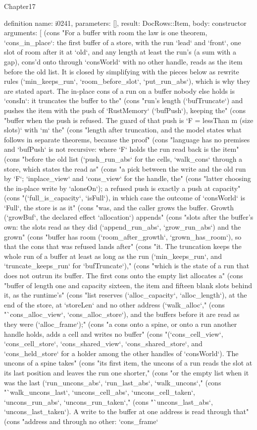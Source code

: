 \begin{lexlean}{Chapter17}
\begin{semanticmodule}
definition{
  name: i0241,
  parameters: [],
  result: DocRows::Item,
  body: constructor{
    arguments: [
      (cons "For a buffer with room the law is one theorem, `cons_in_place`: the first buffer of a store, with the run `lead` and `front`, one slot of room after it at `old`, and any length at least the run's (a sum with a gap), cons'd onto through `consWorld` with no other handle, reads as the item before the old list. It is closed by simplifying with the pieces below as rewrite rules (`min_keeps_run`, `room_before_slot`, `put_run_abs`), which is why they are stated apart. The in-place cons of a run on a buffer nobody else holds is `consIn`: it truncates the buffer to the" (cons "run's length (`bufTruncate`) and pushes the item with the push of `RustMemory` (`bufPush`), keeping the" (cons "buffer when the push is refused. The guard of that push is `F = lessThan m (size slots)` with `m` the" (cons "length after truncation, and the model states what follows in separate theorems, because the proof" (cons "language has no premises and `bufPush` is not recursive: where `F` holds the run read back is the item" (cons "before the old list (`push_run_abs` for the cells, `walk_cons` through a store, which states the read as" (cons "a pick between the write and the old run by `F`; `inplace_view` and `cons_view` for the handle, the" (cons "latter choosing the in-place write by `aloneOn`); a refused push is exactly a push at capacity" (cons "(`full_is_capacity`, `isFull`), in which case the outcome of `consWorld` is `Full`, the store is as it" (cons "was, and the caller grows the buffer. Growth (`growBuf`, the declared effect `allocation`) appends" (cons "slots after the buffer's own: the slots read as they did (`append_run_abs`, `grow_run_abs`) and the grown" (cons "buffer has room (`room_after_growth`, `grown_has_room`), so that the cons that was refused lands after" (cons "it. The truncation keeps the whole run of a buffer at least as long as the run (`min_keeps_run`, and `truncate_keeps_run` for `bufTruncate`)," (cons "which is the state of a run that does not outrun its buffer. The first cons onto the empty list allocates a" (cons "buffer of length one and capacity sixteen, the item and fifteen blank slots behind it, as the runtime's" (cons "list reserves (`alloc_capacity`, `alloc_length`), at the end of the store, at `storeLen` and no other address (`walk_alloc`," (cons "`cons_alloc_view`, `cons_alloc_store`), and the buffers before it are read as they were (`alloc_frame`);" (cons "a cons onto a spine, or onto a run another handle holds, adds a cell and writes no buffer" (cons "(`cons_cell_view`, `cons_cell_store`, `cons_shared_view`, `cons_shared_store`, and `cons_held_store` for a holder among the other handles of `consWorld`). The uncons of a spine takes" (cons "its first item, the uncons of a run reads the slot at its last position and leaves the run one shorter," (cons "or the empty list when it was the last (`run_uncons_abs`, `run_last_abs`, `walk_uncons`," (cons "`walk_uncons_last`, `uncons_cell_abs`, `uncons_cell_taken`, `uncons_run_abs`, `uncons_run_taken`," (cons "`uncons_last_abs`, `uncons_last_taken`). A write to the buffer at one address is read through that" (cons "address and through no other: `cons_frame` }}
\end{semanticmodule}
\end{lexlean}
